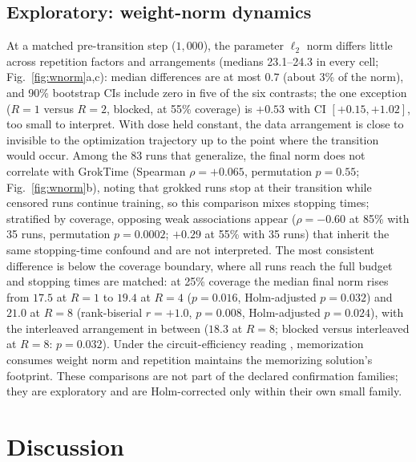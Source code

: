 \documentclass[10pt]{article}
\newcommand{\groktime}{GrokTime}
\begin{document}
\subsection{Exploratory: weight-norm dynamics}
\label{sec:wnorm}

At a matched pre-transition step ($1{,}000$), the parameter $\ell_2$ norm differs little across repetition factors and arrangements (medians 23.1--24.3 in every cell; Fig.~\ref{fig:wnorm}a,c): median differences are at most $0.7$ (about 3\% of the norm), and 90\% bootstrap CIs include zero in five of the six contrasts; the one exception ($R=1$ versus $R=2$, blocked, at 55\% coverage) is $+0.53$ with CI $[+0.15, +1.02]$, too small to interpret. With dose held constant, the data arrangement is close to invisible to the optimization trajectory up to the point where the transition would occur. Among the 83 runs that generalize, the final norm does not correlate with \groktime{} (Spearman $\rho = +0.065$, permutation $p = 0.55$; Fig.~\ref{fig:wnorm}b), noting that grokked runs stop at their transition while censored runs continue training, so this comparison mixes stopping times; stratified by coverage, opposing weak associations appear ($\rho = -0.60$ at 85\% with 35 runs, permutation $p = 0.0002$; $+0.29$ at 55\% with 35 runs) that inherit the same stopping-time confound and are not interpreted. The most consistent difference is below the coverage boundary, where all runs reach the full budget and stopping times are matched: at 25\% coverage the median final norm rises from $17.5$ at $R=1$ to $19.4$ at $R=4$ ($p=0.016$, Holm-adjusted $p=0.032$) and $21.0$ at $R=8$ (rank-biserial $r=+1.0$, $p=0.008$, Holm-adjusted $p=0.024$), with the interleaved arrangement in between ($18.3$ at $R=8$; blocked versus interleaved at $R=8$: $p=0.032$). Under the circuit-efficiency reading \citep{varma2024explaining}, memorization consumes weight norm and repetition maintains the memorizing solution's footprint. These comparisons are not part of the declared confirmation families; they are exploratory and are Holm-corrected only within their own small family.

\section{Discussion}
\end{document}
